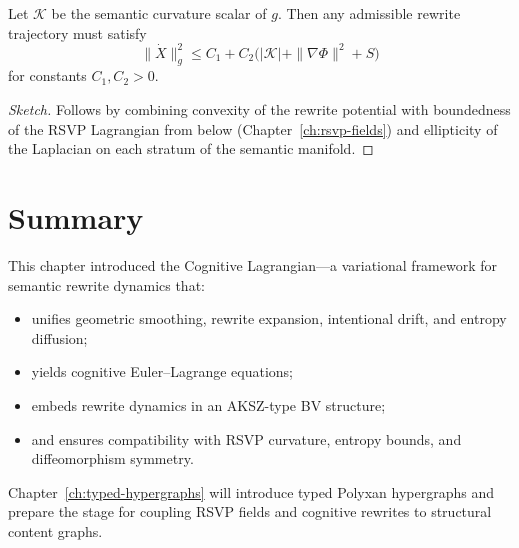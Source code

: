 \begin{proposition}
Let $\mathcal{K}$ be the semantic curvature scalar of $g$. Then any admissible
rewrite trajectory must satisfy
\[
\|\dot{X}\|_g^2
\le
C_1 + C_2 \bigl(|\mathcal{K}| + \|\nabla\Phi\|^2 + S\bigr)
\]
for constants $C_1,C_2>0$.
\end{proposition}

\begin{proof}[Sketch]
Follows by combining convexity of the rewrite potential with boundedness of
the RSVP Lagrangian from below (Chapter~\ref{ch:rsvp-fields}) and ellipticity
of the Laplacian on each stratum of the semantic manifold.
\end{proof}

\section{Summary}

This chapter introduced the Cognitive Lagrangian---a variational framework for
semantic rewrite dynamics that:
\begin{itemize}
  \item unifies geometric smoothing, rewrite expansion, intentional drift, and
        entropy diffusion;
  \item yields cognitive Euler--Lagrange equations;
  \item embeds rewrite dynamics in an AKSZ-type BV structure;
  \item and ensures compatibility with RSVP curvature, entropy bounds, and
        diffeomorphism symmetry.
\end{itemize}

Chapter~\ref{ch:typed-hypergraphs} will introduce typed Polyxan hypergraphs and
prepare the stage for coupling RSVP fields and cognitive rewrites to structural
content graphs.
